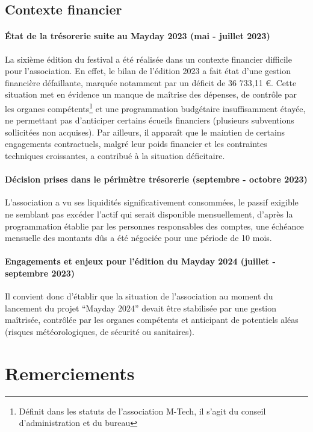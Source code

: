 \documentclass[12pt,a4paper]{report}
\begin{document}
\subsection*{Contexte financier}

\paragraph*{État de la trésorerie suite au Mayday 2023 (mai - juillet 2023)}
La sixième édition du festival a été réalisée dans un contexte financier difficile pour l’association. En effet, le bilan de l'édition 2023 a fait état d'une gestion financière défaillante, marquée notamment par un déficit de 36 733,11 €. Cette situation met en évidence un manque de maîtrise des dépenses, de contrôle par les organes compétents\footnote{Définit dans les statuts de l'association M-Tech, il s'agit du conseil d'administration et du bureau} et une programmation budgétaire insuffisamment étayée, ne permettant pas d'anticiper certains écueils financiers (plusieurs subventions sollicitées non acquises). Par ailleurs, il apparaît que le maintien de certains engagements contractuels, malgré leur poids financier et les contraintes techniques croissantes, a contribué à la situation déficitaire.

\paragraph*{Décision prises dans le périmètre trésorerie (septembre - octobre 2023)}
L'association a vu ses liquidités significativement consommées, le passif exigible ne semblant pas excéder l'actif qui serait disponible mensuellement, d'après la programmation établie par les personnes responsables des comptes, une échéance mensuelle des montants dûs a été négociée pour une période de 10 mois.

\paragraph*{Engagements et enjeux pour l'édition du Mayday 2024 (juillet - septembre 2023)}
Il convient donc d'établir que la situation de l'association au moment du lancement du projet “Mayday 2024” devait être stabilisée par une gestion maîtrisée, contrôlée par les organes compétents et anticipant de potentiels aléas (risques météorologiques, de sécurité ou sanitaires).

\newpage
\section*{Remerciements}
\end{document}
